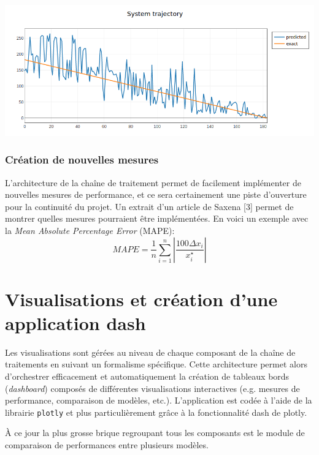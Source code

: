 \begin{center}
\includegraphics[width=1\textwidth]{figures/system_trajectory.png}
\label{fig13}
\end{center}

\subsection{Création de nouvelles mesures}

L’architecture de la chaîne de traitement permet de facilement implémenter de nouvelles mesures de performance, et ce sera certainement une piste d’ouverture pour la continuité du projet. Un extrait d’un article de Saxena [3] permet de montrer quelles mesures pourraient être implémentées. En voici un exemple avec la \textit{Mean Absolute Percentage Error} (MAPE):
$$MAPE =\frac{1}{n}\sum_{i=1}^{n} \left \lvert \frac{100\Delta x_{i}}{x^{\star}_{i}} \right \rvert $$


\chapter{Visualisations et création d’une application dash}

Les visualisations sont gérées au niveau de chaque composant de la chaîne de traitements en suivant
un formalisme spécifique. Cette architecture
permet alors d'orchestrer efficacement et automatiquement la création de tableaux bords
(\textit{dashboard}) composés de différentes visualisations interactives (e.g. mesures de
performance, comparaison de modèles, etc.). L’application est codée à l’aide de la librairie \texttt{plotly} et plus particulièrement grâce à la fonctionnalité dash de plotly.

À ce jour la plus grosse brique regroupant tous les composants est le module de comparaison de
performances entre plusieurs modèles.

